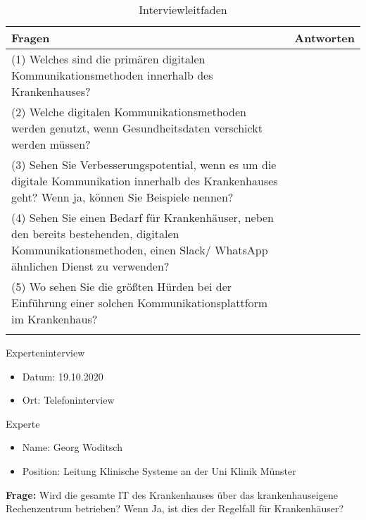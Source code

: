 \begin{longtable}{p{12cm}|p{3cm}}
  \textbf{Fragen}                                                                                                                                           &   \textbf{Antworten}   \\ \hline
(1) Welches sind die primären digitalen Kommunikationsmethoden innerhalb des Krankenhauses?  &     \\ \hline
(2)	Welche digitalen Kommunikationsmethoden werden genutzt, wenn Gesundheitsdaten verschickt werden müssen?                                       &          \\ \hline
(3)	Sehen Sie Verbesserungspotential, wenn es um die digitale Kommunikation innerhalb des Krankenhauses geht? Wenn ja, können Sie Beispiele nennen?                                                            &       \\ \hline
(4)	Sehen Sie einen Bedarf für Krankenhäuser, neben den bereits bestehenden, digitalen Kommunikationsmethoden, einen Slack/ WhatsApp ähnlichen Dienst zu verwenden?                                                          &       \\ \hline
(5)	Wo sehen Sie die größten Hürden bei der Einführung einer solchen Kommunikationsplattform im Krankenhaus?                &          \\ \hline
\caption{Interviewleitfaden} 
\end{longtable}
\newpage
{}

Experteninterview
\begin{itemize}
  \item Datum: 19.10.2020
  \item Ort: Telefoninterview
\end{itemize}

Experte
\begin{itemize}
  \item Name: Georg Woditsch 
  \item Position: Leitung Klinische Systeme an der Uni Klinik Münster
\end{itemize}

\textbf{Frage: }Wird die gesamte IT des Krankenhauses über das krankenhauseigene Rechenzentrum betrieben?  Wenn Ja, ist dies der Regelfall für Krankenhäuser?

